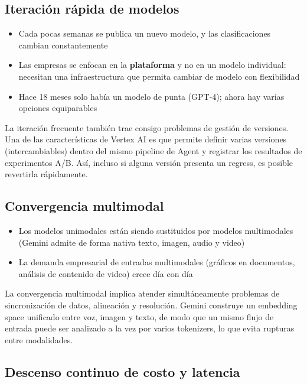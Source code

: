 \subsection{Iteración rápida de modelos}

\begin{itemize}
    \item Cada pocas semanas se publica un nuevo modelo, y las clasificaciones cambian constantemente
    \item Las empresas se enfocan en la \textbf{plataforma} y no en un modelo individual: necesitan una infraestructura que permita cambiar de modelo con flexibilidad
    \item Hace 18 meses solo había un modelo de punta (GPT-4); ahora hay varias opciones equiparables
\end{itemize}

La iteración frecuente también trae consigo problemas de gestión de versiones. Una de las características de Vertex AI es que permite definir varias versiones (intercambiables) dentro del mismo pipeline de Agent y registrar los resultados de experimentos A/B. Así, incluso si alguna versión presenta un regress, es posible revertirla rápidamente.

\subsection{Convergencia multimodal}

\begin{itemize}
    \item Los modelos unimodales están siendo sustituidos por modelos multimodales (Gemini admite de forma nativa texto, imagen, audio y video)
    \item La demanda empresarial de entradas multimodales (gráficos en documentos, análisis de contenido de video) crece día con día
\end{itemize}

La convergencia multimodal implica atender simultáneamente problemas de sincronización de datos, alineación y resolución. Gemini construye un embedding space unificado entre voz, imagen y texto, de modo que un mismo flujo de entrada puede ser analizado a la vez por varios tokenizers, lo que evita rupturas entre modalidades.

\subsection{Descenso continuo de costo y latencia}

